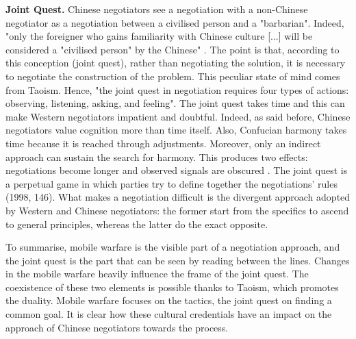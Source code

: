 \documentclass[../main.tex]{subfiles}
\begin{document}
\textbf{Joint Quest.} Chinese negotiators see a negotiation with a non-Chinese negotiator as a negotiation between a civilised person and a "barbarian". Indeed, "only the foreigner who gains familiarity with Chinese culture [...] will be considered a "civilised person" by the Chinese" \autocite[43]{faure1}. The point is that, according to this conception (joint quest), rather than negotiating the solution, it is necessary to negotiate the construction of the problem. This peculiar state of mind comes from Taoism. Hence, "the joint quest in negotiation requires four types of actions: observing, listening, asking, and feeling"\mancite\autocite[144]{faure1}. The joint quest takes time and this can make Western negotiators impatient and doubtful. Indeed, as said before, Chinese negotiators value cognition more than time itself. Also, Confucian harmony takes time because it is reached through adjustments. Moreover, only an indirect approach can sustain the search for harmony. This produces two effects: negotiations become longer and observed signals are obscured \mancite\autocite[145]{faure1}. The joint quest is a perpetual game in which parties try to define together the negotiations' rules (1998, 146). What makes a negotiation difficult is the divergent approach adopted by Western and Chinese negotiators: the former start from the specifics to ascend to general principles, whereas the latter do the exact opposite.

To summarise, mobile warfare is the visible part of a negotiation approach, and the joint quest is the part that can be seen by reading between the lines. Changes in the mobile warfare heavily influence the frame of the joint quest. The coexistence of these two elements is possible thanks to Taoism, which promotes the duality. Mobile warfare focuses on the tactics, the joint quest on finding a common goal. It is clear how these cultural credentials have an impact on the approach of Chinese negotiators towards the process.\\


\end{document}
